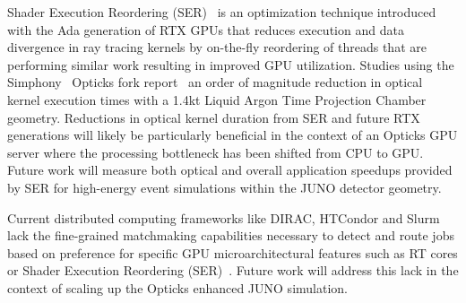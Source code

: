 \documentclass{webofc}
\begin{document}
Shader Execution Reordering (SER)~\cite{ser} is an optimization technique introduced with the Ada 
generation of RTX GPUs that reduces execution and data divergence in ray tracing kernels by on-the-fly reordering of threads that
are performing similar work resulting in improved GPU utilization.
Studies using the Simphony~\cite{simphony} Opticks fork report~\cite{sergalgoczi} an order of magnitude reduction
in optical kernel execution times with a 1.4kt Liquid Argon Time Projection Chamber geometry. 
Reductions in optical kernel duration from SER and future RTX generations will likely be particularly beneficial in the
context of an Opticks GPU server where the processing bottleneck has been shifted from CPU to GPU. Future work will measure both optical
and overall application speedups provided by SER for high-energy event simulations within the JUNO detector geometry.

Current distributed computing frameworks like DIRAC, HTCondor and Slurm 
lack the fine-grained matchmaking capabilities necessary to detect and route jobs
based on preference for specific GPU microarchitectural features such as RT cores
or Shader Execution Reordering (SER)~\cite{ser}. Future work will address this lack in the context
of scaling up the Opticks enhanced JUNO simulation.  
%
%
\end{document}
